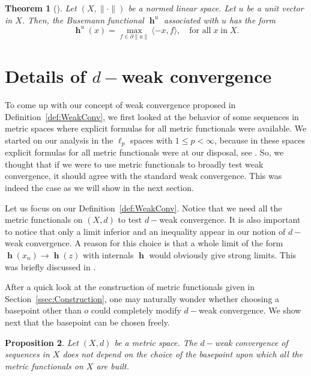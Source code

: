 \documentclass[a4paper,12pt]{article}
\newtheorem{thm}{Theorem}[section]
\newtheorem{prop}[thm]{Proposition}
\theoremstyle{definition}
\DeclareMathOperator{\h}{\mathbf{h}}
\newcommand{\norm}[1]{\lVert#1\rVert}
\newcommand{\dpair}[2]{\langle#1, #2\rangle}
\numberwithin{equation}{section}
\begin{document}
\begin{thm}[{\cite[Proposition~4.12]{Gutierrez-Nevanlinna2024}}]
Let $(X,\norm{\cdot})$ be a normed linear space.
Let $u$ be a unit vector in $X$. Then, the Busemann functional $\h^u$ associated 
with $u$ has the form
\begin{displaymath}
	\h^u(x) = \max_{f \in \partial \norm{u}} \dpair{-x}{f},\quad
	\text{for all}\;x\;\text{in}\;X.   
\end{displaymath}
\end{thm}


\section{Details of $d-$weak convergence}\label{sec:WC}
To come up with our concept of weak convergence proposed in 
Definition~\ref{def:WeakConv}, we first looked at the behavior of some sequences
in metric spaces where explicit formulas for all metric functionals were 
available. We started on our analysis in the $\ell_p$ spaces with 
$1\leq p< \infty$, because in these spaces explicit formulas for all metric 
functionals were at our disposal, see \cite{Gutierrez2019-2}. So, we thought that 
if we were to use metric functionals to broadly test weak convergence, it should 
agree with the standard weak convergence. This was indeed the case as we will 
show in the next section.

Let us focus on our Definition~\ref{def:WeakConv}. Notice that we need all the 
metric functionals on $(X,d)$ to test $d-$weak convergence. It is also important 
to notice that only a limit inferior and an inequality appear in our notion of 
$d-$weak convergence. A reason for this choice is that a whole limit of the form 
$\h(x_n)\rightarrow \h(z)$ with internals $\h$ would obviously give strong limits. 
This was briefly discussed in \cite[Section~6]{Karlsson2021}.

After a quick look at the construction of metric functionals given in 
Section~\ref{ssec:Construction}, 
one may naturally wonder whether choosing a basepoint other than $o$ could 
completely modify $d-$weak convergence. We show next that the basepoint can be 
chosen freely.

\begin{prop} 
Let $(X,d)$ be a metric space. The $d-$weak convergence of sequences in $X$ does 
not depend on the choice of the basepoint upon which all the metric functionals 
on $X$ are built.
\end{prop}
\end{document}
